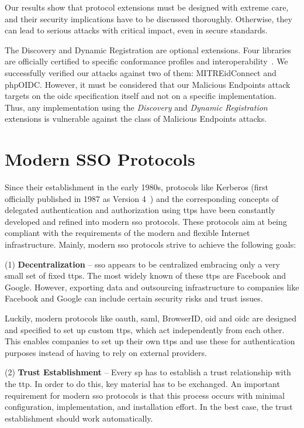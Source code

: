 \documentclass[conference,compsoc]{IEEEtran}
\begin{document}
\noindent Our results show that protocol extensions must be designed with extreme care, and their security implications have to be discussed thoroughly.
Otherwise, they can lead to serious attacks with critical impact, even in secure standards.

The Discovery and Dynamic Registration are optional extensions. Four libraries are officially certified to specific conformance profiles and interoperability~\cite{oidcCeritification}.
We successfully verified our attacks against two of them:  MITREidConnect and phpOIDC.
However, it must be considered that our Malicious Endpoints attack targets on the \gls{oidc} specification itself and not on a specific implementation.
Thus, any implementation using the \emph{Discovery} and \emph{Dynamic Registration} extensions is vulnerable against the class of Malicious Endpoints attacks.

 \section{Modern SSO Protocols} 
\label{sec:basics}

Since their establishment in the early 1980s, protocols like Kerberos (first officially published in 1987 as Version 4~\cite{miller1987kerberos}) and the corresponding concepts of delegated authentication and authorization using \glspl{ttp} have been constantly developed and refined into modern \gls{sso} protocols.
These protocols aim at being compliant with the requirements of the modern and flexible Internet infrastructure.
Mainly, modern \gls{sso} protocols strive to achieve the following goals:

(1) \textbf{Decentralization} --
\gls{sso} appears to be centralized embracing only a very small set of fixed \glspl{ttp}.
The most widely known of these \glspl{ttp} are Facebook and Google.
However, exporting data and outsourcing infrastructure to companies like Facebook and Google can include certain security risks and trust issues.

Luckily, modern protocols like \gls{oauth}, \gls{saml}, BrowserID, \gls{oid} and \gls{oidc} are designed and specified to set up custom \glspl{ttp}, which act independently from each other.
This enables companies to set up their own \glspl{ttp} and use these for authentication purposes instead of having to rely on external providers.

(2) \textbf{Trust Establishment} -- Every \gls{sp} has to establish a trust relationship with the \gls{ttp}. 
In order to do this, key material has to be exchanged. 
An important requirement for modern \gls{sso} protocols is that this process occurs with minimal configuration, implementation, and installation effort.
In the best case, the trust establishment should work automatically. 
\end{document}
